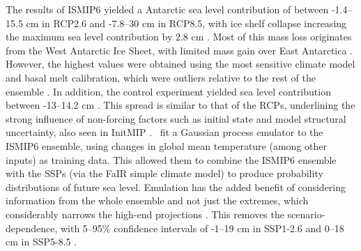 The results of ISMIP6 yielded a Antarctic sea level contribution of between -1.4--15.5 cm in RCP2.6 and -7.8--30 cm in RCP8.5, with ice shelf collapse increasing the maximum sea level contribution by 2.8 cm \citep{seroussiISMIP6AntarcticaMultimodel2020}. Most of this mass loss originates from the West Antarctic Ice Sheet, with limited mass gain over East Antarctica \citep{seroussiISMIP6AntarcticaMultimodel2020}. However, the highest values were obtained using the most sensitive climate model and basal melt calibration, which were outliers relative to the rest of the ensemble \citep{edwardsProjectedLandIce2021}. In addition, the control experiment yielded sea level contribution between -13--14.2 cm \citep{seroussiISMIP6AntarcticaMultimodel2020}. This spread is similar to that of the RCPs, underlining the strong influence of non-forcing factors such as initial state and model structural uncertainty, also seen in InitMIP \citep{seroussiInitMIPAntarcticaIceSheet2019}.~\cite{edwardsProjectedLandIce2021} fit a Gaussian process emulator to the ISMIP6 ensemble, using changes in global mean temperature (among other inputs) as training data. This allowed them to combine the ISMIP6 ensemble with the SSPs (via the FaIR simple climate model) to produce probability distributions of future sea level. Emulation has the added benefit of considering information from the whole ensemble and not just the extremes, which considerably narrows the high-end projections \citep{edwardsProjectedLandIce2021}. This removes the scenario-dependence, with 5--95\% confidence intervals of -1--19 cm in SSP1-2.6 and 0--18 cm in SSP5-8.5 \citep{fox-kemperOceanCryosphereSea2021}.~

